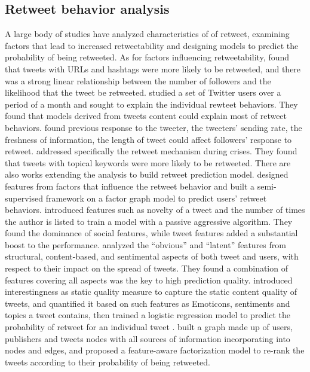 \documentclass{acm_proc_article-sp}
\begin{document}
\subsection{Retweet behavior analysis}
A large body of studies have analyzed characteristics of of retweet, examining factors that lead to increased retweetability and designing models to predict the probability of being retweeted. 
As for factors influencing retweetability, \cite{Suh2010} found that tweets with URLs and hashtags were more likely to be retweeted, and there was a strong linear relationship between the number of followers and the likelihood that the tweet be retweeted. 
\cite{conf/icwsm/MacskassyM11} studied a set of Twitter users over a period of a month and sought to explain the individual rewteet behaviors.
They found that models derived from tweets content could explain most of retweet behaviors.
\cite{Comarela:2012UFA} found previous response to the tweeter, the tweeters’ sending rate, the freshness of information, the length of tweet could affect followers’ response to retweet. 
\cite{Starbird:2012RRI} addressed specifically the retweet mechanism during crises. 
They found that tweets with topical keywords were more likely to be retweeted. 
There are also works extending the analysis to build retweet prediction model. 
\cite{conf/cikm/YangGCTLZS10} designed features from factors that influence the retweet behavior and built a semi-supervised framework on a factor graph model to predict users’ retweet behaviors. 
\cite{Osborne_Lavrenko_2011} introduced features such as novelty of a tweet and the number of times the author is listed to train a model with a passive aggressive algorithm. 
They found the dominance of social features, while tweet features added a substantial boost to the performance.
\cite{Jenders:2013APV} analyzed the “obvious” and “latent” features from structural, content-based, and sentimental aspects of both tweet and users, with respect to their impact on the spread of tweets. 
They found a combination of features covering all aspects was the key to high prediction quality.
\cite{Naveed:2011SMC,2011:NaveedGKC} introduced interestingness as static quality measure to capture the static content quality of tweets, and quantified it based on such features as Emoticons, sentiments and topics a tweet contains, then trained a logistic regression model to predict the probability of retweet for an individual tweet .
\cite{conf/wsdm/FengW13} built a graph made up of users, publishers and tweets nodes with all sources of information incorporating into nodes and edges, and proposed a feature-aware factorization model to re-rank the tweets according to their probability of being retweeted.
\end{document}

